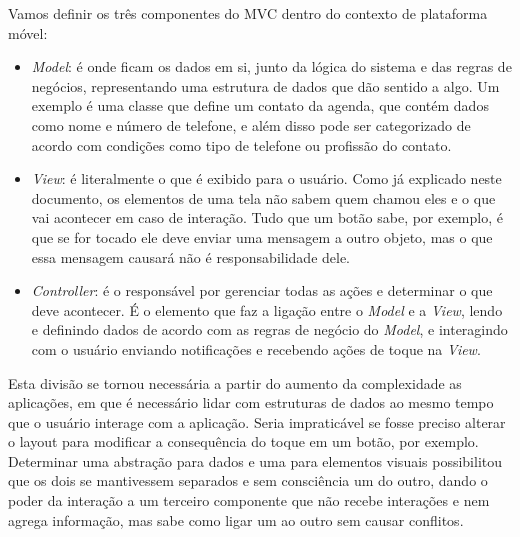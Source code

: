 \documentclass[a4paper,12pt,brazil,doubleside]{book}
\begin{document}
\begin{singlespace}
Vamos definir os três componentes do MVC dentro do contexto de plataforma móvel:
\begin{itemize}
\item \emph{Model}: é onde ficam os dados em si, junto da lógica do sistema e das regras de negócios, representando uma estrutura de dados que dão sentido a algo. Um exemplo é uma classe que define um contato da agenda, que contém dados como nome e número de telefone, e além disso pode ser categorizado de acordo com condições como tipo de telefone ou profissão do contato.
\item \emph{View}: é literalmente o que é exibido para o usuário. Como já explicado neste documento, os elementos de uma tela não sabem quem chamou eles e o que vai acontecer em caso de interação. Tudo que um botão sabe, por exemplo, é que se for tocado ele deve enviar uma mensagem a outro objeto, mas o que essa mensagem causará não é responsabilidade dele.
\item \emph{Controller}: é o responsável por gerenciar todas as ações e determinar o que deve acontecer. É o elemento que faz a ligação entre o \emph{Model} e a \emph{View}, lendo e definindo dados de acordo com as regras de negócio do \emph{Model}, e interagindo com o usuário enviando notificações e recebendo ações de toque na \emph{View}.
\end{itemize}

Esta divisão se tornou necessária a partir do aumento da complexidade as aplicações, em que é necessário lidar com estruturas de dados ao mesmo tempo que o usuário interage com a aplicação. Seria impraticável se fosse preciso alterar o layout para modificar a consequência do toque em um botão, por exemplo. Determinar uma abstração para dados e uma para elementos visuais possibilitou que os dois se mantivessem separados e sem consciência um do outro, dando o poder da interação a um terceiro componente que não recebe interações e nem agrega informação, mas sabe como ligar um ao outro sem causar conflitos.

\end{singlespace}




\singlespace
{}
\cleardoublepage
\thispagestyle{empty}
{}


\doublespace
\end{document}
